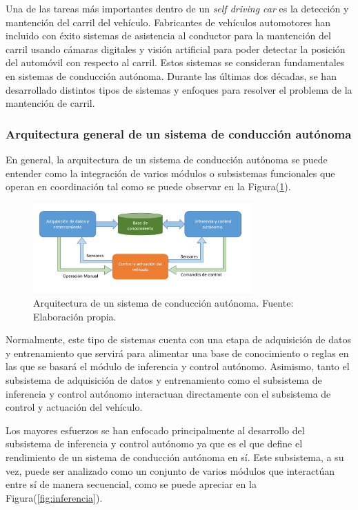 \documentclass[12pt,letterpaper]{article}
\begin{document}
Una de las tareas más importantes dentro de un \textit{self driving car} es la detección y mantención del carril del 
vehículo. Fabricantes de vehículos automotores han incluido con éxito sistemas de asistencia al conductor para la 
mantención del carril usando cámaras digitales y visión artificial para poder detectar la posición del automóvil con 
respecto al carril. Estos sistemas se consideran fundamentales en sistemas de conducción autónoma. Durante las últimas 
dos décadas, se han desarrollado distintos tipos de sistemas y enfoques para resolver el problema de la mantención de 
carril.

\subsubsection{Arquitectura general de un sistema de conducción autónoma}
En general, la arquitectura de un sistema de conducción autónoma se puede entender como la integración de varios módulos o 
subsistemas funcionales que operan en coordinación tal como se puede observar en la Figura(\ref{fig:esquema}). 


\begin{figure}[!h] 
    \centering
    \includegraphics[width=0.75\textwidth]{img/esquema}
    \caption{Arquitectura de un sistema de conducción autónoma. Fuente: Elaboración propia.}
    \label{fig:esquema}
    \end{figure}


Normalmente, este tipo de sistemas cuenta con una etapa de adquisición de datos y entrenamiento que servirá para 
alimentar una base de conocimiento o reglas en las que se basará el módulo de inferencia y control autónomo. 
Asimismo, tanto el subsistema de adquisición de datos y entrenamiento como el subsistema de inferencia y 
control autónomo interactuan directamente con el subsistema de control y actuación del vehículo. 

Los mayores esfuerzos se han enfocado principalmente al desarrollo del subsistema de inferencia y 
control autónomo ya que es el que define el rendimiento de un sistema de conducción autónoma en sí. 
Este subsistema, a su vez, puede ser analizado como un conjunto de varios módulos que interactúan 
entre sí de manera secuencial, como se puede apreciar en la Figura(\ref{fig:inferencia}). 
\end{document}
